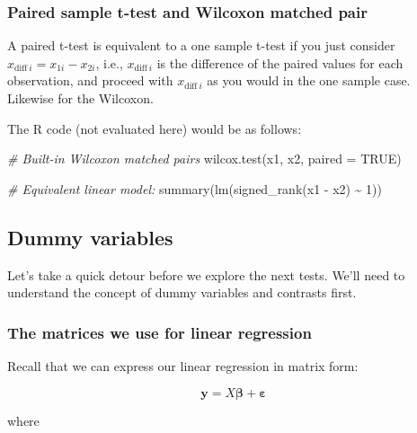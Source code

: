 \documentclass[
  openany]{book}
\newenvironment{Shaded}{\begin{snugshade}}{\end{snugshade}}
\newcommand{\AttributeTok}[1]{\textcolor[rgb]{0.77,0.63,0.00}{#1}}
\newcommand{\CommentTok}[1]{\textcolor[rgb]{0.56,0.35,0.01}{\textit{#1}}}
\newcommand{\ConstantTok}[1]{\textcolor[rgb]{0.00,0.00,0.00}{#1}}
\newcommand{\DecValTok}[1]{\textcolor[rgb]{0.00,0.00,0.81}{#1}}
\newcommand{\FunctionTok}[1]{\textcolor[rgb]{0.00,0.00,0.00}{#1}}
\newcommand{\NormalTok}[1]{#1}
\newcommand{\SpecialCharTok}[1]{\textcolor[rgb]{0.00,0.00,0.00}{#1}}
\begin{document}
\hypertarget{paired-sample-t-test-and-wilcoxon-matched-pair}{%
\subsubsection{Paired sample t-test and Wilcoxon matched pair}\label{paired-sample-t-test-and-wilcoxon-matched-pair}}

A paired t-test is equivalent to a one sample t-test if you just consider \(x_{\text{diff}\ i} = x_{1i} - x_{2i}\), i.e., \(x_{\text{diff}\ i}\) is the difference of the paired values for each observation, and proceed with \(x_{\text{diff}\ i}\) as you would in the one sample case. Likewise for the Wilcoxon.

The R code (not evaluated here) would be as follows:

\begin{Shaded}
\begin{Highlighting}[]
\CommentTok{\# Built{-}in Wilcoxon matched pairs}
\FunctionTok{wilcox.test}\NormalTok{(x1, x2, }\AttributeTok{paired =} \ConstantTok{TRUE}\NormalTok{)}

\CommentTok{\# Equivalent linear model:}
\FunctionTok{summary}\NormalTok{(}\FunctionTok{lm}\NormalTok{(}\FunctionTok{signed\_rank}\NormalTok{(x1 }\SpecialCharTok{{-}}\NormalTok{ x2) }\SpecialCharTok{\textasciitilde{}} \DecValTok{1}\NormalTok{))}
\end{Highlighting}
\end{Shaded}

\hypertarget{dummy-variables}{%
\subsection{Dummy variables}\label{dummy-variables}}

Let's take a quick detour before we explore the next tests. We'll need to understand the concept of dummy variables and contrasts first.

\hypertarget{the-matrices-we-use-for-linear-regression}{%
\subsubsection{The matrices we use for linear regression}\label{the-matrices-we-use-for-linear-regression}}

Recall that we can express our linear regression in matrix form:

\[\mathbf{y} = X\boldsymbol\beta + \boldsymbol\varepsilon\]

where
\end{document}
